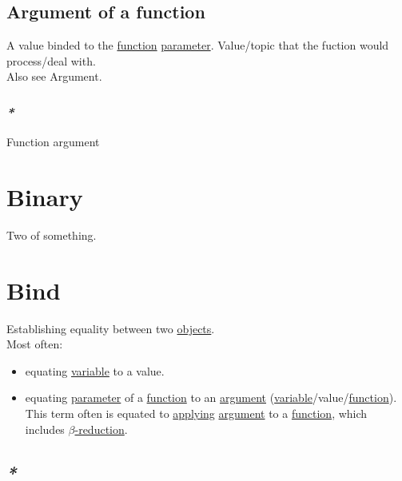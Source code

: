 \documentclass[a4paper,14pt,oneside]{book}
\begin{document}
\section{\label{org91f8762}Argument of a function}
\label{sec:org65f621a}
A value binded to the \hyperref[org8cc2ae4]{function} \hyperref[orged2015b]{parameter}. Value/topic that the fuction would process/deal with.\\

Also see \label{org14a63cb}Argument.\\

\subsection{\emph{*}}
\label{sec:org3f1fdb6}

\label{org3f0e64b}Function argument\\

\chapter{\label{orgd0575cd}Binary}
\label{sec:orge2c9158}
Two of something.\\

\chapter{\label{orgc6ab53c}Bind}
\label{sec:org3c8f14b}
Establishing equality between two \hyperref[org22f7883]{objects}.\\

Most often:\\
\begin{itemize}
\item equating \hyperref[org029d8fd]{variable} to a value.\\
\item equating \hyperref[orged2015b]{parameter} of a \hyperref[org8cc2ae4]{function} to an \hyperref[org8cb9182]{argument} (\hyperref[org029d8fd]{variable}/value/\hyperref[org8cc2ae4]{function}). This term often is equated to \hyperref[org950e91e]{applying} \hyperref[org8cb9182]{argument} to a \hyperref[org8cc2ae4]{function}, which includes \hyperref[orgfd6ad3f]{\(\beta\)-reduction}.\\
\end{itemize}

\section{\emph{*}}
\label{sec:org27f9980}
\end{document}
